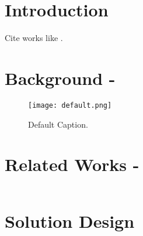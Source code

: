 
\section{Introduction}

\lipsum[1]

Cite works like \cite{confexample,journalexample,presexample,techreportexample,bookexample}.


\section{Background - }

\lipsum[3]

\begin{figure}[htbp]
	\centering	
	\texttt{[image: default.png]}
	\caption[Default Small Caption]{Default Caption.}
	\label{fig:DefaultLabel}
\end{figure}

\lipsum[4]


\section{Related Works - }

\lipsum[5]

\inputminted[linenos]{javascript}{codes/example.js}


\section{Solution Design}

\lipsum[6]




